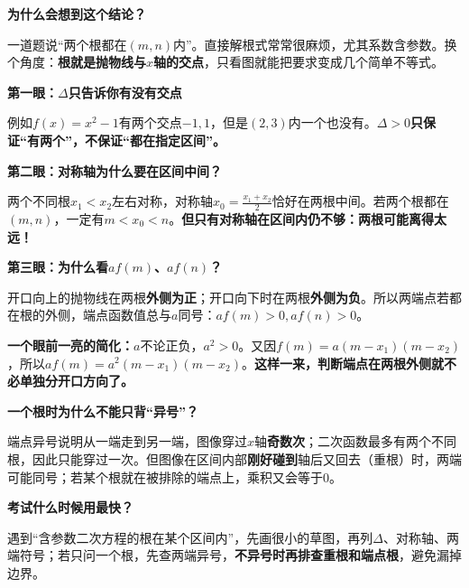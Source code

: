 \begin{explanationbox}
\textbf{\textcolor{CExplanation}{为什么会想到这个结论？}}\par
一道题说“两个根都在$(m,n)$内”。直接解根式常常很麻烦，尤其系数含参数。换个角度：\textbf{根就是抛物线与$x$轴的交点}，只看图就能把要求变成几个简单不等式。

\medskip
\textbf{\textcolor{CExplanation}{第一眼：$\Delta$只告诉你有没有交点}}\par
例如$f(x)=x^2-1$有两个交点$-1,1$，但是$(2,3)$内一个也没有。\textbf{$\Delta>0$只保证“有两个”，不保证“都在指定区间”。}
\begin{center}

\end{center}

\textbf{\textcolor{CExplanation}{第二眼：对称轴为什么要在区间中间？}}\par
两个不同根$x_1<x_2$左右对称，对称轴$x_0=\frac{x_1+x_2}{2}$恰好在两根中间。若两个根都在$(m,n)$，一定有$m<x_0<n$。\textbf{但只有对称轴在区间内仍不够：两根可能离得太远！}

\medskip
\textbf{\textcolor{CExplanation}{第三眼：为什么看$af(m)$、$af(n)$？}}\par
开口向上的抛物线在两根\textbf{外侧为正}；开口向下时在两根\textbf{外侧为负}。所以两端点若都在根的外侧，端点函数值总与$a$同号：$af(m)>0,af(n)>0$。
\begin{center}

\end{center}
\textbf{一个眼前一亮的简化：}$a$不论正负，$a^2>0$。又因$f(m)=a(m-x_1)(m-x_2)$，所以$af(m)=a^2(m-x_1)(m-x_2)$。\textbf{这样一来，判断端点在两根外侧就不必单独分开口方向了。}

\medskip
\textbf{\textcolor{CExplanation}{一个根时为什么不能只背“异号”？}}\par
端点异号说明从一端走到另一端，图像穿过$x$轴\textbf{奇数次}；二次函数最多有两个不同根，因此只能穿过一次。但图像在区间内部\textbf{刚好碰到}轴后又回去（重根）时，两端可能同号；若某个根就在被排除的端点上，乘积又会等于$0$。
\begin{center}

\end{center}

\textbf{\textcolor{CExplanation}{考试什么时候用最快？}}\par
遇到“含参数二次方程的根在某个区间内”，先画很小的草图，再列$\Delta$、对称轴、两端符号；若只问一个根，先查两端异号，\textbf{不异号时再排查重根和端点根}，避免漏掉边界。
\end{explanationbox}

